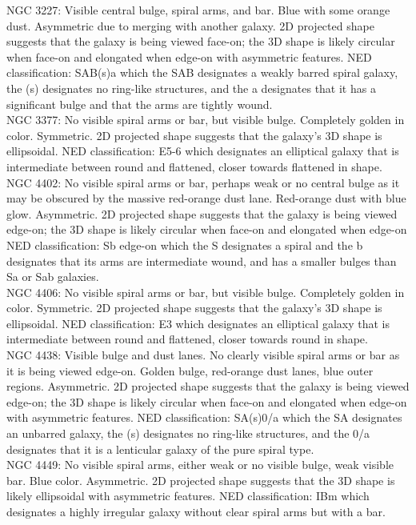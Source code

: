 \documentclass[10pt,letterpaper]{article}
\begin{document}
NGC 3227: Visible central bulge, spiral arms, and bar. Blue with some orange dust. Asymmetric due to merging with another galaxy. 2D projected shape suggests that the galaxy is being viewed face-on; the 3D shape is likely circular when face-on and elongated when edge-on with asymmetric features. NED classification: SAB(s)a which the SAB designates a weakly barred spiral galaxy, the (s) designates no ring-like structures, and the a designates that it has a significant bulge and that the arms are tightly wound.\\

NGC 3377: No visible spiral arms or bar, but visible bulge. Completely golden in color. Symmetric. 2D projected shape suggests that the galaxy's 3D shape is ellipsoidal. NED classification: E5-6 which designates an elliptical galaxy that is intermediate between round and flattened, closer towards flattened in shape.\\

NGC 4402: No visible spiral arms or bar, perhaps weak or no central bulge as it may be obscured by the massive red-orange dust lane. Red-orange dust with blue glow. Asymmetric. 2D projected shape suggests that the galaxy is being viewed edge-on; the 3D shape is likely circular when face-on and elongated when edge-on NED classification: Sb edge-on which the S designates a spiral and the b designates that its arms are intermediate wound, and has a smaller bulges than Sa or Sab galaxies.\\

NGC 4406:  No visible spiral arms or bar, but visible bulge. Completely golden in color. Symmetric. 2D projected shape suggests that the galaxy's 3D shape is ellipsoidal. NED classification: E3 which designates an elliptical galaxy that is intermediate between round and flattened, closer towards round in shape.\\

NGC 4438: Visible bulge and dust lanes. No clearly visible spiral arms or bar as it is being viewed edge-on. Golden bulge, red-orange dust lanes, blue outer regions. Asymmetric. 2D projected shape suggests that the galaxy is being viewed edge-on; the 3D shape is likely circular when face-on and elongated when edge-on with asymmetric features. NED classification: SA(s)0/a which the SA designates an unbarred galaxy, the (s) designates no ring-like structures, and the 0/a designates that it is a lenticular galaxy of the pure spiral type.\\

NGC 4449: No visible spiral arms, either weak or no visible bulge, weak visible bar. Blue color. Asymmetric. 2D projected shape suggests that the 3D shape is likely ellipsoidal with asymmetric features. NED classification: IBm which designates a highly irregular galaxy without clear spiral arms but with a bar.\\
\end{document}
